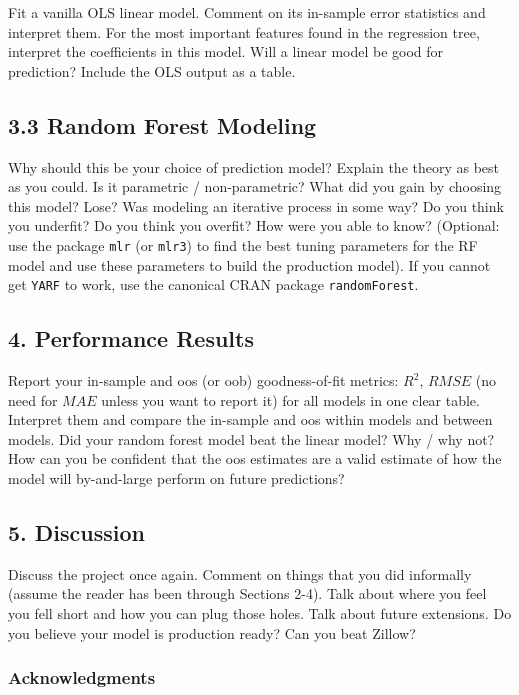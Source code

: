 \documentclass[12pt]{article}
\begin{document}
\begin{tcolorbox}
Fit a vanilla OLS linear model. Comment on its in-sample error statistics and interpret them. For the most important features found in the regression tree, interpret the coefficients in this model. Will a linear model be good for prediction? Include the OLS output as a table.

\subsection*{3.3 Random Forest Modeling}

Why should this be your choice of prediction model? Explain the theory as best as you could. Is it parametric / non-parametric? What did you gain by choosing this model? Lose? Was modeling an iterative process in some way? Do you think you underfit? Do you think you overfit? How were you able to know? (Optional: use the package \texttt{mlr} (or \texttt{mlr3}) to find the best tuning parameters for the RF model and use these parameters to build the production model). If you cannot get \texttt{YARF} to work, use the canonical CRAN package \texttt{randomForest}.

\subsection*{4. Performance Results}

Report your in-sample and oos (or oob) goodness-of-fit metrics: $R^2$, $RMSE$ (no need for $MAE$ unless you want to report it) for all models in one clear table. Interpret them and compare the in-sample and oos within models and between models. Did your random forest model beat the linear model? Why / why not? How can you be confident that the oos estimates are a valid estimate of how the model will by-and-large perform on future predictions?  

\subsection*{5. Discussion}

Discuss the project once again. Comment on things that you did informally (assume the reader has been through Sections 2-4). Talk about where you feel you fell short and how you can plug those holes. Talk about future extensions. Do you believe your model is production ready? Can you beat Zillow?


\subsubsection*{Acknowledgments}


\end{tcolorbox}
\end{document}
